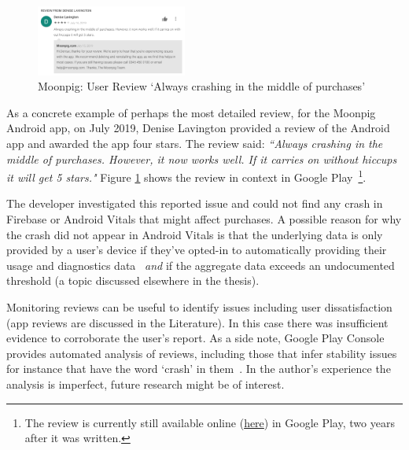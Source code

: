 \begin{figure}
    \includegraphics[width=0.44\textwidth]{images/google-play/Denise-Lavington-Review-moonpig-crashing-2019.png}
  \caption[Moonpig: User Review in Google Play `Always crashes...']{Moonpig: User Review `Always crashing in the middle of purchases'}
  \label{fig:gp-review-denise-lavington-always-crashes}
\end{figure}

As a concrete example of perhaps the most detailed review, for the Moonpig Android app, on  July 2019, Denise Lavington provided a review of the Android app and awarded the app four stars. The review said: \emph{``Always crashing in the middle of purchases. However, it now works well. If it carries on without hiccups it will get 5 stars."} Figure \ref{fig:gp-review-denise-lavington-always-crashes} shows the review in context in Google Play~\footnote{The review is currently still available online (\href{https://play.google.com/store/apps/details?id=com.commonagency.moonpig.uk&reviewId=gp\%3AAOqpTOH68VB5eWqnu7UAqcC81_rbOfWl6dzL_g48jrg0T40MPWBkMxe01KjStXZF6F57nxZxQa-AqosRKDd1xQ}{here}) in Google Play, two years after it was written.}.

The developer investigated this reported issue and could not find any crash in Firebase or Android Vitals that might affect purchases. A possible reason for why the crash did not appear in Android Vitals is that the underlying data is only provided by a user's device if they've opted-in to automatically providing their usage and diagnostics data~\citep{google_play_view_crashes_and_anr_errors} \textit{and} if the aggregate data exceeds an undocumented threshold (a topic discussed elsewhere in the thesis). 

Monitoring reviews can be useful to identify issues including user dissatisfaction (app reviews are discussed in the Literature). In this case there was insufficient evidence to corroborate the user's report. As a side note, Google Play Console provides automated analysis of reviews, including those that infer stability issues for instance that have the word `crash' in them~\citep{googlesupport_reviews_analysis}. In the author's experience the analysis is imperfect, future research might be of interest.


